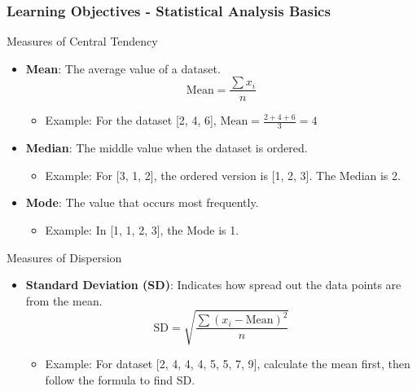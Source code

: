 \documentclass[aspectratio=169]{beamer}
\begin{document}
\begin{frame}[fragile]
    \frametitle{Learning Objectives - Statistical Analysis Basics}
    \begin{block}{Measures of Central Tendency}
        \begin{itemize}
            \item \textbf{Mean}: The average value of a dataset.
                \begin{equation}
                \text{Mean} = \frac{\sum{x_i}}{n}
                \end{equation}
                \begin{itemize}
                    \item Example: For the dataset [2, 4, 6], \( \text{Mean} = \frac{2 + 4 + 6}{3} = 4 \)
                \end{itemize}
            \item \textbf{Median}: The middle value when the dataset is ordered.
                \begin{itemize}
                    \item Example: For [3, 1, 2], the ordered version is [1, 2, 3]. The Median is 2.
                \end{itemize}
            \item \textbf{Mode}: The value that occurs most frequently.
                \begin{itemize}
                    \item Example: In [1, 1, 2, 3], the Mode is 1.
                \end{itemize}
        \end{itemize}
    \end{block}
    
    \begin{block}{Measures of Dispersion}
        \begin{itemize}
            \item \textbf{Standard Deviation (SD)}: Indicates how spread out the data points are from the mean.
                \begin{equation}
                \text{SD} = \sqrt{\frac{\sum{(x_i - \text{Mean})^2}}{n}}
                \end{equation}
                \begin{itemize}
                    \item Example: For dataset [2, 4, 4, 4, 5, 5, 7, 9], calculate the mean first, then follow the formula to find SD.
                \end{itemize}
        \end{itemize}
    \end{block}
\end{frame}
\end{document}
